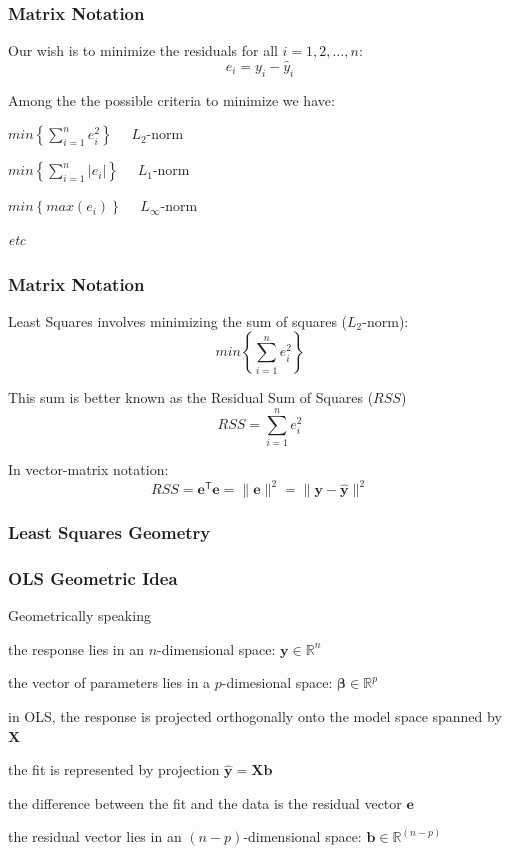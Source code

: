 \documentclass[12pt]{beamer}\usepackage[]{graphicx}\usepackage[]{color}
\begin{document}

\begin{frame}
\frametitle{Matrix Notation}

Our wish is to minimize the residuals for all $i = 1, 2, \dots, n$:
$$
e_i = y_i - \hat{y}_i
$$

Among the the possible criteria to minimize we have:
\bi
  \item $min \left \{ \sum_{i=1}^{n} e_{i}^{2} \right \} \quad$ {\lolit $L_2$-norm}
  \item $min \left \{ \sum_{i=1}^{n} |e_i| \right \} \quad$ {\lolit $L_1$-norm}
  \item $min \left \{ max(e_i) \right \} \quad$ {\lolit $L_\infty$-norm}
  \item \textit{etc}
\ei

\end{frame}


\begin{frame}
\frametitle{Matrix Notation}

Least Squares involves minimizing the sum of squares ($L_2$-norm): 
$$
min \left \{ \sum_{i=1}^{n} e_{i}^{2} \right \}
$$

This sum is better known as the Residual Sum of Squares ($RSS$)
$$
RSS = \sum_{i=1}^{n} e_{i}^{2}
$$

In vector-matrix notation:
$$
RSS = \mathbf{e^{\mathsf{T}} e} = \| \mathbf{e} \|^2 = \| \mathbf{y - \hat{y}} \|^2
$$

\end{frame}


\begin{frame}
\frametitle{Least Squares Geometry}
\begin{center}
\end{center}
\end{frame}


\begin{frame}
\frametitle{OLS Geometric Idea}

Geometrically speaking

\bi
  \item the response lies in an $n$-dimensional space: $\mathbf{y} \in \mathbb{R}^n$
  \item the vector of parameters lies in a $p$-dimesional space: $\boldsymbol{\beta} \in \mathbb{R}^p$ 
  \item in OLS, the response is projected orthogonally onto the model space spanned by $\mathbf{X}$
  \item the fit is represented by projection $\mathbf{\hat{y} = Xb}$
  \item the difference between the fit and the data is the residual vector $\mathbf{e}$
  \item the residual vector lies in an $(n-p)$-dimensional space: $\mathbf{b} \in \mathbb{R}^{(n-p)}$
\ei

\end{frame}
\end{document}
